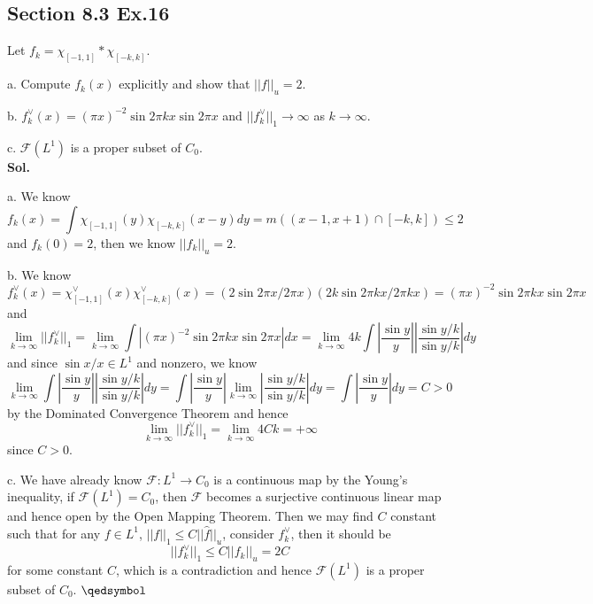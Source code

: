 \documentclass[lang=en,11pt,a4paper,citestyle =authoryear]{elegantpaper}
\newcommand{\prvd}{$\hfill \qedsymbol$}
\begin{document}
\subsection*{Section 8.3 Ex.16} 
Let $f_k = \chi_{[-1,1]}*\chi_{[-k,k]}$.\par
a. Compute $f_k(x)$ explicitly and show that $||f||_u = 2$.\par
b. $f_k^{\vee}(x) = (\pi x)^{-2}\sin2\pi kx\sin 2\pi x$ and $||f_k^{\vee}||_1 \to \infty$ as $k\to\infty$.\par
c. $\mathcal{F}(L^1)$ is a proper subset of $C_0$.
\vspace{0.5em}\\
\textbf{Sol.} \par
a. We know
\[
f_k(x) = \int \chi_{[-1,1]}(y)\chi_{[-k,k]}(x-y)dy  = m((x-1,x+1)\cap[-k,k]) \leq 2
\]
and $f_k(0) = 2$, then we know $||f_k||_u = 2$.\par
b. We know
\[
f_k^{\vee}(x) = \chi_{[-1,1]}^{\vee}(x)\chi_{[-k,k]}^{\vee}(x) = (2\sin2\pi x/2\pi x)(2k\sin 2\pi kx/2\pi k x) = (\pi x)^{-2}\sin 2\pi k x\sin 2\pi x
\]
and
\[
\lim_{k\to\infty}||f_k^{\vee}||_1 = \lim_{k\to\infty}\int |(\pi x)^{-2}\sin 2\pi k x\sin 2\pi x| dx = \lim_{k\to\infty}4k \int|\dfrac{\sin y}{y}||\dfrac{\sin y/k}{\sin y/k}|dy
\]
and since $\sin x/x \in L^1$ and nonzero, we know 
\[
\lim_{k\to\infty} \int|\dfrac{\sin y}{y}||\dfrac{\sin y/k}{\sin y/k}|dy = \int|\dfrac{\sin y}{y}|\lim_{k\to\infty}|\dfrac{\sin y/k}{\sin y/k}|dy = \int|\dfrac{\sin y}{y}|dy = C >0
\]
by the Dominated Convergence Theorem and hence
\[
\lim_{k\to\infty}||f_k^{\vee}||_1 = \lim_{k\to\infty}4Ck = +\infty
\]
since $C>0$.\par
c. We have already know $\mathcal{F}:L^1 \to C_0$ is a continuous map by the Young's inequality, if $\mathcal{F}(L^1) = C_0$, then $\mathcal{F}$ becomes a surjective continuous linear map and hence open by the Open Mapping Theorem. Then we may find $C$ constant such that for any $f\in L^1$, $||f||_1 \leq C||\hat{f}||_u$, consider $f_k^{\vee}$, then it should be
\[
||f_k^{\vee}||_1 \leq C||f_k||_u = 2C
\]
for some constant $C$, which is a contradiction and hence $\mathcal{F}(L^1)$ is a proper subset of $C_0$.
\prvd
\vspace{0.5em}
\end{document}
